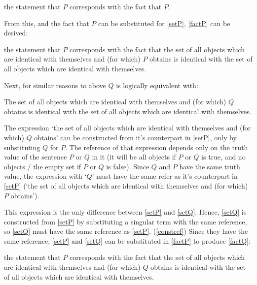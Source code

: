 	\begin{example} \label{stateP}
	the statement that $P$ corresponds with the fact that $P$.
	\end{example}

From this, and the fact that $P$ can be substituted for \ref{setP}, \ref{factP} can be derived:

	\begin{example} \label{factP}
	the statement that $P$ corresponds with the fact that the set of all objects which are identical with themselves and (for which) $P$ obtains is identical with the set of all objects which are identical with themselves.
	\end{example}

Next, for similar reasons to above $Q$ is logically equivalent with:

	\begin{example} \label{setQ}
	The set of all objects which are identical with themselves and (for which) $Q$ obtains is identical with the set of all objects which are identical with themselves.
	\end{example}

The expression `the set of all objects which are identical with themselves and (for which) $Q$ obtains' can be constructed from it's counterpart in \ref{setP}, only by substituting $Q$ for $P$.
The reference of that expression depends only on the truth value of the sentence $P$ or $Q$ in it (it will be all objects if $P$ or $Q$ is true, and no objects / the empty set if $P$ or $Q$ is false).
Since $Q$ and $P$ have the same truth value, the expression with `$Q$' must have the same refer as it's counterpart in \ref{setP} (`the set of all objects which are identical with themselves and (for which) $P$ obtains').

This expression is the only difference between \ref{setP} and \ref{setQ}.
Hence, \ref{setQ} is constructed from \ref{setP} by substituting a singular term with the same reference, so \ref{setQ} must have the same reference as \ref{setP}.
(\ref{constref})
Since they have the same reference, \ref{setP} and \ref{setQ} can be substituted in \ref{factP} to produce \ref{factQ}:

	\begin{example}\label{factQ}
	the statement that $P$ corresponds with the fact that the set of all objects which are identical with themselves and (for which) $Q$ obtains is identical with the set of all objects which are identical with themselves.
	\end{example}

